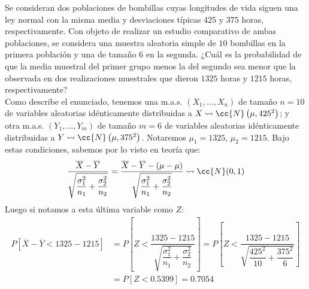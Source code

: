 \begin{ejercicio}
    Se consideran dos poblaciones de bombillas cuyas longitudes de vida siguen una ley normal con la misma media y desviaciones típicas $425$ y $375$ horas, respectivamente.  Con objeto de realizar un estudio comparativo de ambas poblaciones, se considera una muestra aleatoria simple de $10$ bombillas en la primera población y una de tamaño 6 en la segunda. ¿Cuál es la probabilidad de que la media muestral del primer grupo menos la del segundo sea menor que la observada en dos realizaciones muestrales que dieron $1325$ horas y $1215$ horas, respectivamente?\\

    \noindent
    Como describe el enunciado, tenemos una m.a.s. $(X_1, \ldots, X_n)$ de tamaño $n=10$ de variables aleatorias idénticamente distribuidas a $X\rightsquigarrow\cc{N}\left(\mu, {425}^{2}\right)$; y otra m.a.s. $(Y_1, \ldots, Y_m)$ de tamaño $m=6$ de variables aleatorias idénticamente distribuidas a $Y\rightsquigarrow\cc{N}\left(\mu, {375}^{2}\right)$. Notaremos $\mu_1 = 1325$, $\mu_2 = 1215$. Bajo estas condiciones, sabemos por lo visto en teoría que:
    \begin{equation*}
        \dfrac{\overline{X}-\overline{Y}}{\sqrt{\dfrac{\sigma_1^2}{n_1}+\dfrac{\sigma_2^2}{n_2}}} = \dfrac{\overline{X}-\overline{Y}-(\mu - \mu)}{\sqrt{\dfrac{\sigma_1^2}{n_1}+\dfrac{\sigma_2^2}{n_2}}}  \rightsquigarrow \cc{N}(0,1)
    \end{equation*}
    Luego si notamos a esta última variable como $Z$:
    \begin{align*}
        P[\overline{X}-\overline{Y}<1325-1215] &= P\left[Z < \dfrac{1325-1215}{\sqrt{\dfrac{\sigma_1^2}{n_1}+\dfrac{\sigma_2^2}{n_2}}}\right] = P\left[Z <  \dfrac{1325-1215}{\sqrt{\dfrac{{425}^{2}}{10}+\dfrac{{375}^{2}}{6}}}\right] \\
                                               &= P[Z<0.5399] = 0.7054
    \end{align*}
\end{ejercicio}

